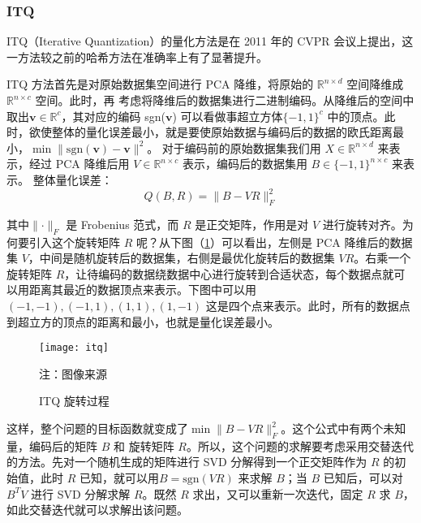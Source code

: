 \subsubsection{ITQ}
ITQ（Iterative Quantization）\cite{YunchaoGong:2011:IQP:2191740.2191779}的量化方法是在 2011 年的 CVPR 会议上提出，这一方法较之前的哈希方法在准确率上有了显著提升。

ITQ 方法首先是对原始数据集空间进行 PCA 降维，将原始的 $\mathbb{R}^{n\times d}$ 空间降维成 $\mathbb{R}^{n\times c}$ 空间。此时，再
考虑将降维后的数据集进行二进制编码。从降维后的空间中取出$\mathbf{v}\in \mathbb{R}^{c}$，其对应的编码 sgn($\mathbf{v}$) 可以看做事超立方体$\{-1,1\}^c$
中的顶点。此时，欲使整体的量化误差最小，就是要使原始数据与编码后的数据的欧氏距离最小，$\min{\lVert \mathrm{sgn}(\mathbf{v})-\mathbf{v}\rVert ^2}$。
对于编码前的原始数据集我们用 $X \in \mathbb{R}^{n\times d}$ 来表示，经过 PCA 降维后用 $V \in \mathbb{R}^{n\times c}$ 表示，编码后的数据集用 $B \in \{-1,1\}^{n\times c}$ 来表示。
整体量化误差：
\begin{equation}
Q(B, R) = \lVert B - VR \rVert_F ^2
\end{equation}

其中$\lVert \cdot \rVert_F$ 是 Frobenius 范式，而 $R$ 是正交矩阵，作用是对 $V$ 进行旋转对齐。为何要引入这个旋转矩阵 $R$ 呢？从下图（\ref{fig:itq}）可以看出，左侧是 PCA 降维后的数据集 $V$，中间是随机旋转后的数据集，右侧是最优化旋转后的数据集 $VR$。右乘一个旋转矩阵 $R$，让待编码的数据绕数据中心进行旋转到合适状态，每个数据点就可以用距离其最近的数据顶点来表示。下图中可以用 $(-1, -1), (-1, 1), (1, 1), (1, -1) $ 这是四个点来表示。此时，所有的数据点到超立方的顶点的距离和最小，也就是量化误差最小。
\begin{figure}[H]
  \centering
  \texttt{[image: itq]}
  \caption{ITQ 旋转过程}
  \label{fig:itq}
  \footnotesize 注：图像来源\cite{YunchaoGong:2011:IQP:2191740.2191779}
\end{figure}
这样，整个问题的目标函数就变成了$\min \lVert B - VR \rVert_F ^2$。这个公式中有两个未知量，编码后的矩阵 $B$ 和 旋转矩阵 $R$。所以，这个问题的求解要考虑采用交替迭代的方法。先对一个随机生成的矩阵进行 SVD 分解得到一个正交矩阵作为 $R$ 的初始值，此时 $R$ 已知，就可以用$ B= \mathrm{sgn}(VR)$ 来求解 $B$；当 $B$ 已知后，可以对 $B^TV$ 进行 SVD 分解求解 $R$。既然 $R$ 求出，又可以重新一次迭代，固定 $R$ 求 $B$，如此交替迭代就可以求解出该问题。


